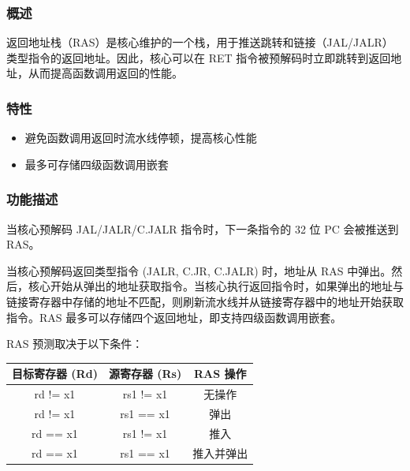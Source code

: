 \documentclass[main\_\_CN.tex]{subfiles}
\begin{document}
\subsubsection{概述}
\label{sec:riscvcpu-perf-ras-overview}
返回地址栈（RAS）是核心维护的一个栈，用于推送跳转和链接（JAL/JALR）类型指令的返回地址。因此，核心可以在 RET 指令被预解码时立即跳转到返回地址，从而提高函数调用返回的性能。

\subsubsection{特性}
\label{sec:riscvcpu-perf-ras-features}

\begin{itemize}
    \item 避免函数调用返回时流水线停顿，提高核心性能
    \item 最多可存储四级函数调用嵌套
\end{itemize}


\subsubsection{功能描述}
\label{sec:riscvcpu-perf-ras-func-descr}
当核心预解码 JAL/JALR/C.JALR 指令时，下一条指令的 32 位 PC 会被推送到 RAS。

当核心预解码返回类型指令 (JALR, C.JR, C.JALR) 时，地址从 RAS 中弹出。然后，核心开始从弹出的地址获取指令。当核心执行返回指令时，如果弹出的地址与链接寄存器中存储的地址不匹配，则刷新流水线并从链接寄存器中的地址开始获取指令。RAS 最多可以存储四个返回地址，即支持四级函数调用嵌套。

RAS 预测取决于以下条件：

\begin{longtable}{ | c | c | c | }
\hline\rowcolor{lightgray}
目标寄存器 (Rd) & 源寄存器 (Rs) & RAS 操作 \\ \hline
\endfirsthead
\hline
rd != x1 & rs1 != x1 & 无操作 \\ \hline
rd != x1 & rs1 == x1 & 弹出 \\ \hline
rd == x1 & rs1 != x1 & 推入 \\ \hline
rd == x1 & rs1 == x1 & 推入并弹出 \\ \hline
\end{longtable}
\end{document}
